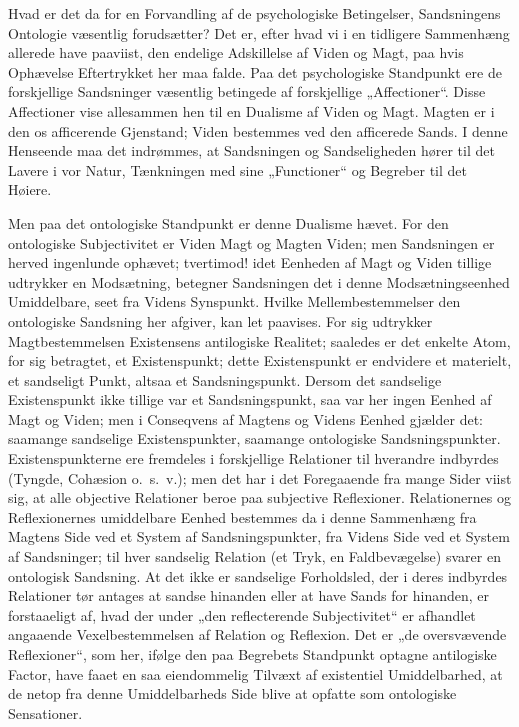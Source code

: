 \documentclass[12pt]{book}
\newcommand{\opage}[1]{\marginnote{\footnotesize\textit{[#1]}}}
\begin{document}
Hvad er det da for en Forvandling af de psychologiske Betingelser, Sandsningens Ontologie væsentlig
forudsætter? Det er, efter hvad vi i en tidligere Sammenhæng allerede have paaviist, den endelige
Adskillelse af Viden og Magt, paa hvis Ophævelse Eftertrykket her maa falde. Paa det psychologiske
Standpunkt ere de forskjellige Sandsninger væsentlig betingede af forskjellige „Affectioner“. Disse
Affectioner vise allesammen hen til en Dualisme af Viden og Magt. Magten er i den os afficerende
Gjenstand; Viden bestemmes ved den afficerede Sands. I denne Henseende maa det indrømmes, at
Sandsningen og Sandseligheden hører til det Lavere i vor Natur, Tænkningen med sine „Functioner“ og
Begreber til det Høiere.

Men paa det ontologiske Standpunkt er denne Dualisme
\opage{258} hævet. For den ontologiske Subjectivitet er Viden Magt og Magten Viden; men Sandsningen er herved
ingenlunde ophævet; tvertimod! idet Eenheden af Magt og Viden tillige udtrykker en Modsætning,
betegner Sandsningen det i denne Modsætningseenhed Umiddelbare, seet fra Videns Synspunkt. Hvilke
Mellembestemmelser den ontologiske Sandsning her afgiver, kan let paavises. For sig udtrykker
Magtbestemmelsen Existensens antilogiske Realitet; saaledes er det enkelte Atom, for sig betragtet, et
Existenspunkt; dette Existenspunkt er endvidere et materielt, et sandseligt Punkt, altsaa et
Sandsningspunkt. Dersom det sandselige Existenspunkt ikke tillige var et Sandsningspunkt, saa var her
ingen Eenhed af Magt og Viden; men i Conseqvens af Magtens og Videns Eenhed gjælder det: saamange
sandselige Existenspunkter, saamange ontologiske Sandsningspunkter. Existenspunkterne ere fremdeles i
forskjellige Relationer til hverandre indbyrdes (Tyngde, Cohæsion o.\ s.\ v.); men det har i det
Foregaaende fra mange Sider viist sig, at alle objective Relationer beroe paa subjective Reflexioner.
Relationernes og Reflexionernes umiddelbare Eenhed bestemmes da i denne Sammenhæng fra Magtens Side
ved et System af Sandsningspunkter, fra Videns Side ved et System af Sandsninger; til hver sandselig
Relation (et Tryk, en Faldbevægelse) svarer en ontologisk Sandsning. At det ikke er sandselige
Forholdsled, der i deres indbyrdes Relationer tør antages at sandse hinanden eller at have Sands for
hinanden, er forstaaeligt af, hvad der under „den reflecterende Subjectivitet“ er afhandlet angaaende
Vexelbestemmelsen af Relation og Reflexion. Det er „de oversvævende Reflexioner“, som her, ifølge den
paa Begrebets Standpunkt optagne antilogiske Factor, have faaet en saa eiendommelig Tilvæxt af
existentiel Umiddelbarhed, at de netop fra denne Umiddelbarheds Side blive at opfatte som ontologiske
Sensationer.
\end{document}
